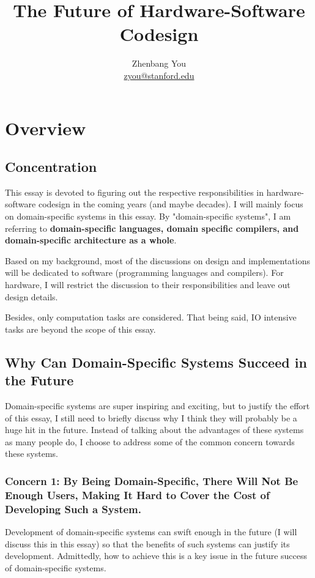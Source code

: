 \documentclass[11pt]{article}
\title{The Future of Hardware-Software Codesign}
\author{Zhenbang You\\ \href{zyou@stanford.edu}{zyou@stanford.edu}}
\date{}
\begin{document}
\maketitle

\section{Overview}

\subsection{Concentration}
This essay is devoted to figuring out the respective responsibilities in hardware-software codesign in the coming years (and maybe decades).
I will mainly focus on domain-specific systems in this essay.
By "domain-specific systems", I am referring to \textbf{domain-specific languages, domain specific compilers, and domain-specific architecture as a whole}.

Based on my background, most of the discussions on design and implementations will be dedicated to software (programming languages and compilers).
For hardware, I will restrict the discussion to their responsibilities and leave out design details.

Besides, only computation tasks are considered.
That being said, IO intensive tasks are beyond the scope of this essay.

\subsection{Why Can Domain-Specific Systems Succeed in the Future}
Domain-specific systems are super inspiring and exciting, but to justify the effort of this essay, I still need to briefly discuss why I think they will probably be a huge hit in the future.
Instead of talking about the advantages of these systems as many people do, I choose to address some of the common concern towards these systems.

\subsubsection*{Concern 1: By Being Domain-Specific, There Will Not Be Enough Users, Making It Hard to Cover the Cost of Developing Such a System.}
Development of domain-specific systems can swift enough in the future (I will discuss this in this essay) so that the benefits of such systems can justify its development.
Admittedly, how to achieve this is a key issue in the future success of domain-specific systems.
\end{document}
